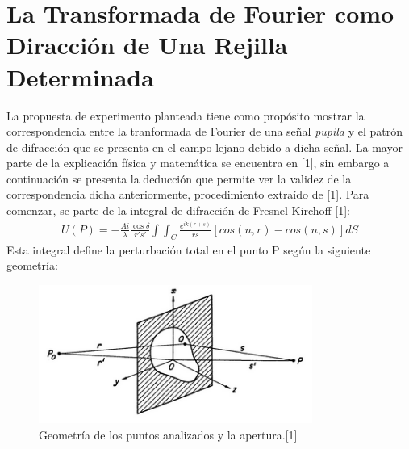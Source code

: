 \documentclass{article}
\begin{document}
\section{La Transformada de Fourier como Diracción de Una Rejilla Determinada}
La propuesta de experimento planteada tiene como propósito mostrar la correspondencia entre la tranformada de Fourier de una señal \textit{pupila} y el patrón de difracción que se presenta en el campo lejano debido a dicha señal. La mayor parte de la explicación física y matemática se encuentra en [1], sin embargo a continuación se presenta la deducción que permite ver la validez de la correspondencia dicha anteriormente, procedimiento extraído de [1]. Para comenzar, se parte de la integral de difracción de Fresnel-Kirchoff [1]:
\begin{eqnarray*}
U(P)=-\frac{Ai}{\lambda}\frac{\cos \delta}{r\prime s\prime}\int \int_C\frac{e^{ik(r+s)}}{rs}[cos(n,r)-cos(n,s)]dS 
\end{eqnarray*}
Esta integral define la perturbación total en el punto P según la siguiente geometría:

\begin{figure}[H]
\centering
\includegraphics[width=0.8\textwidth]{Diagrama.png}
\caption{Geometría de los puntos analizados y la apertura.[1]} \label{fig:geometria}
\end{figure}
\end{document}
